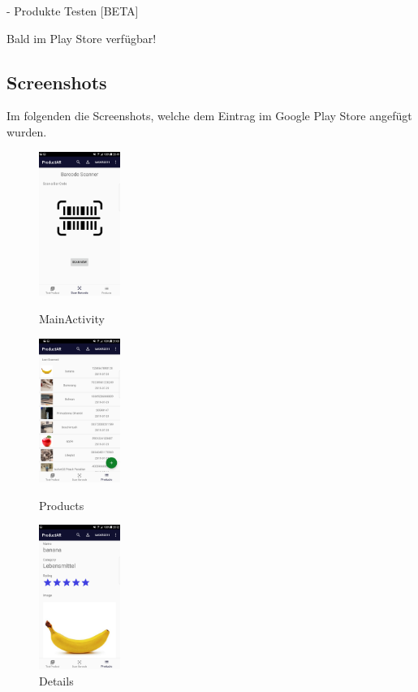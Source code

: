 \documentclass{scrartcl}
\begin{document}
\noindent - Produkte Testen [BETA] \newline 

\noindent Bald im Play Store verfügbar! \newline

\subsection{Screenshots}

Im folgenden die Screenshots, welche dem Eintrag im Google Play Store angefügt wurden. \newline 

\begin{figure}[h]
   \begin{minipage}[b]{.2\linewidth} %
      \includegraphics[width=100px]{img/screenshots/screenshot_1.png}
      \caption{MainActivity}
   \end{minipage}
   \hspace{.1\linewidth}%
   \begin{minipage}[b]{.2\linewidth} %
      \includegraphics[width=100px]{img/screenshots/screenshot_2.png}
      \caption{Products}
   \end{minipage}
   \hspace{.1\linewidth}%
   \begin{minipage}[b]{.2\linewidth} %
      \includegraphics[width=100px]{img/screenshots/screenshot_3.png}
      \caption{Details}
   \end{minipage}
\end{figure}
\end{document}
